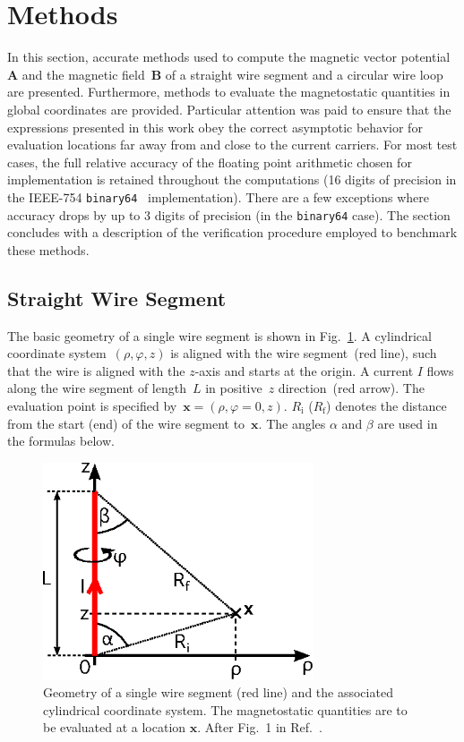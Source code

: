 \FloatBarrier
\section{Methods}
\label{sec:methods}
In this section, accurate methods used to compute the magnetic vector potential~$\mathbf{A}$ and the magnetic field~$\mathbf{B}$
of a straight wire segment and a circular wire loop are presented.
Furthermore, methods to evaluate the magnetostatic quantities in global coordinates are provided.
Particular attention was paid to ensure that the expressions presented in this work
obey the correct asymptotic behavior for evaluation locations
far away from and close to the current carriers.
For most test cases, the full relative accuracy of the floating point
arithmetic chosen for implementation is retained throughout the computations
(16 digits of precision in the IEEE-754 \texttt{binary64}~\cite{ieee754} implementation).
There are a few exceptions where accuracy drops by up to 3 digits of precision
(in the \texttt{binary64} case).
The section concludes with a description of the verification procedure
employed to benchmark these methods.

\FloatBarrier
\subsection{Straight Wire Segment}
\label{sec:methods_sws}
The basic geometry of a single wire segment is shown in Fig.~\ref{fig:straightWireSegment}.
A cylindrical coordinate system~$(\rho, \varphi,z)$ is aligned with the wire segment~(red line),
such that the wire is aligned with the $z$-axis and starts at the origin.
A current $I$ flows along the wire segment of length~$L$ in positive~$z$ direction~(red arrow).
The evaluation point is specified by~$\mathbf{x} = (\rho, \varphi=0, z)$.
$R_\mathrm{i}$ ($R_\mathrm{f}$) denotes the distance from the start (end) of the wire segment to~$\mathbf{x}$.
The angles $\alpha$ and $\beta$ are used in the formulas below.
\begin{figure}[htbp]
 \centering
 \includegraphics[width=8cm]{img/straightWireSegment.eps}
 \caption{Geometry of a single wire segment (red line) and the associated cylindrical coordinate system.
          The magnetostatic quantities are to be evaluated at a location $\mathbf{x}$.
          After Fig.~1 in Ref.~\cite{hanson_hirshman_2002}.}
 \label{fig:straightWireSegment}
\end{figure}

